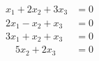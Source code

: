 \begin{align*}
x_1 + 2x_2 + 3x_3 &= 0\\
2x_1 - x_2 + x_3 &= 0\\
3x_1 + x_2 + x_3 &= 0\\
\quad 5x_2 + 2x_3 &= 0
\end{align*}